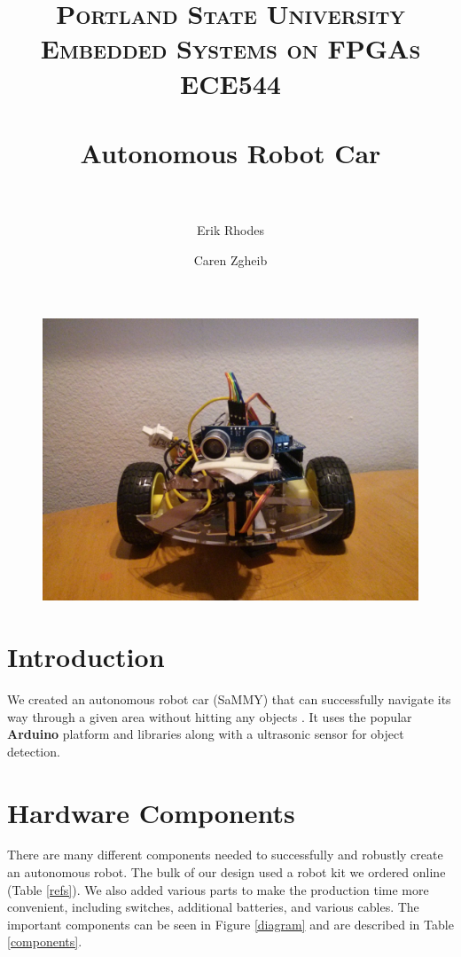 \documentclass[11pt]{article}
\title{	
\normalfont \normalsize 
\textsc{\LARGE Portland State University}\\[1.5cm] %
\textsc{\Large Embedded Systems on FPGAs}\\[0.5cm] %
\textsc{\large ECE544}\\[0.5cm] %
\horrule{1.2pt} \\[0.4cm] %
\huge Autonomous Robot Car \\ %
\horrule{1.2pt} \\[0.5cm] %
}
\begin{document}
\author{Erik Rhodes \and Caren Zgheib} %
\maketitle %
\thispagestyle{empty}


\begin{figure}[h]\centering
\includegraphics[height=0.65\textwidth]{images/bot_front.jpg}
		\label{bot_front}
	\end{figure}
	
\tableofcontents
\newpage

\section{Introduction} 
We created an autonomous robot car (SaMMY) that can successfully navigate its way through a given area without hitting any objects . It uses the popular \textbf{Arduino} platform and libraries along with a ultrasonic sensor for object detection. 


\section{Hardware Components}
There are many different components needed to successfully and robustly create an autonomous robot.  The bulk of our design used a robot kit we ordered online (Table \ref{refs}).  We also added various parts to make the production time more convenient, including switches, additional batteries, and various cables.  The important components can be seen in Figure \ref{diagram} and are described in Table \ref{components}.
\end{document}
